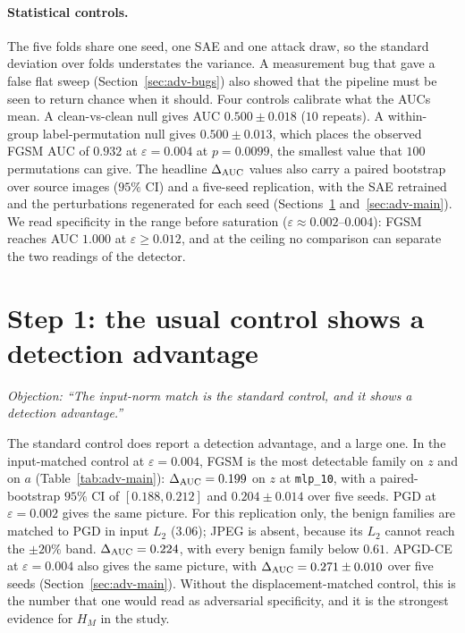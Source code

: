 \documentclass[../ppgc-tese.tex]{subfiles}
\begin{document}
\paragraph*{Statistical controls.}
The five folds share one seed, one SAE and one attack draw, so the standard
deviation over folds understates the variance. A measurement bug that gave a
false flat sweep (Section~\ref{sec:adv-bugs}) also showed that the pipeline
must be seen to return chance when it should. Four controls calibrate what
the AUCs mean. A clean-vs-clean null gives AUC $0.500\pm0.018$ ($10$ repeats).
A within-group label-permutation null gives $0.500\pm0.013$, which places the
observed FGSM AUC of $0.932$ at $\varepsilon{=}0.004$ at $p=0.0099$, the
smallest value that $100$ permutations can give.
The headline $\Delta_{\mathrm{AUC}}$ values also carry a paired bootstrap over source images
($95\%$ CI) and a five-seed replication, with the SAE retrained and the
perturbations regenerated for each seed
(Sections~\ref{sec:adv-usual} and~\ref{sec:adv-main}).
We read specificity in the range before saturation
($\varepsilon\approx0.002$--$0.004$): FGSM reaches AUC $1.000$ at
$\varepsilon\geq0.012$, and at the ceiling no comparison can separate the two
readings of the detector. %

\section{Step 1: the usual control shows a detection advantage}
\label{sec:adv-usual}
\emph{Objection: ``The input-norm match is the standard control, and it shows
a detection advantage.''}

The standard control does report a detection advantage, and a large one. In
the input-matched control at $\varepsilon{=}0.004$, FGSM is the most
detectable family on $z$ and on $a$ (Table~\ref{tab:adv-main}): $\Delta_{\mathrm{AUC}} =
0.199$ on $z$ at \texttt{mlp\_10}, with a paired-bootstrap $95\%$ CI of
$[0.188, 0.212]$ and $0.204\pm0.014$ over five seeds. PGD at
$\varepsilon{=}0.002$ gives the same picture. For this replication only, the
benign families are matched to PGD in input $L_2$ ($3.06$); JPEG is absent,
because its $L_2$ cannot reach the $\pm20\%$ band. $\Delta_{\mathrm{AUC}} = 0.224$, with every
benign family below $0.61$. APGD-CE at $\varepsilon{=}0.004$ also gives the
same picture, with $\Delta_{\mathrm{AUC}} = 0.271\pm0.010$ over five seeds
(Section~\ref{sec:adv-main}).
Without the displacement-matched control, this is the number that one would
read as adversarial specificity, and it is the strongest evidence for $H_{M}$
in the study.
\end{document}
